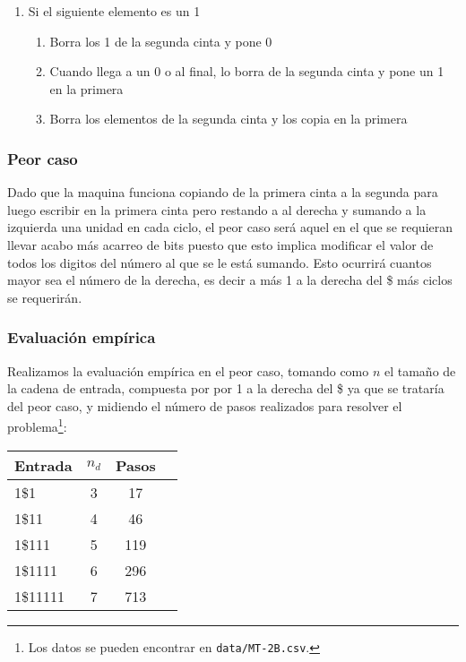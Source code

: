 \begin{itemize}
\begin{enumerate}
\begin{enumerate}
        \end{enumerate}
        \item Si el siguiente elemento es un 1
        \begin{enumerate}
            \item Borra los 1 de la segunda cinta y pone 0
            \item Cuando llega a un 0 o al final, lo borra de la segunda cinta y pone un 1 en la primera
            \item Borra los elementos de la segunda cinta y los copia en la primera
        \end{enumerate}
    \end{enumerate}
\end{itemize}



\subsubsection*{Peor caso}
Dado que la maquina funciona copiando de la primera cinta a la segunda para luego escribir en la primera cinta pero restando a al derecha y sumando a la izquierda una unidad en cada ciclo, el peor caso será aquel en el que se requieran llevar acabo más acarreo de bits puesto que esto implica modificar el valor de todos los digitos del número al que se le está sumando. Esto ocurrirá cuantos mayor sea el número de la derecha, es decir a más 1 a la derecha del \$ más ciclos se requerirán.\\

\subsubsection*{Evaluación empírica}
Realizamos la evaluación empírica en el peor caso, tomando como $n$ el tamaño de la cadena de entrada, compuesta por por 1 a la derecha del \$ ya que se trataría del peor caso, y midiendo el número de pasos realizados para resolver el problema\footnote{Los datos se pueden encontrar en \texttt{data/MT-2B.csv}.}:

\begin{table}[h]
    \centering
    \begin{tabular}{lccc}
        Entrada & $n_d$ & Pasos \\
        \hline
        1\$1                     & 3  & 17   \\
        1\$11                    & 4  & 46   \\
        1\$111                   & 5  & 119   \\
        1\$1111                  & 6  & 296  \\
        1\$11111                 & 7  & 713  \\
    \end{tabular}
\end{table}

